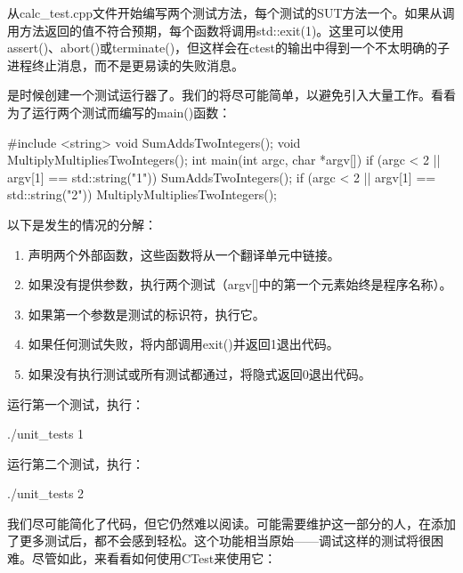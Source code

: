 从calc\_test.cpp文件开始编写两个测试方法，每个测试的SUT方法一个。如果从调用方法返回的值不符合预期，每个函数将调用std::exit(1)。这里可以使用assert()、abort()或terminate()，但这样会在ctest的输出中得到一个不太明确的子进程终止消息，而不是更易读的失败消息。

是时候创建一个测试运行器了。我们的将尽可能简单，以避免引入大量工作。看看为了运行两个测试而编写的main()函数：


\begin{cpp}
#include <string>
void SumAddsTwoIntegers();
void MultiplyMultipliesTwoIntegers();
int main(int argc, char *argv[]) {
    if (argc < 2 || argv[1] == std::string("1"))
        SumAddsTwoIntegers();
    if (argc < 2 || argv[1] == std::string("2"))
        MultiplyMultipliesTwoIntegers();
}
\end{cpp}

以下是发生的情况的分解：

\begin{enumerate}
\item
声明两个外部函数，这些函数将从一个翻译单元中链接。

\item
如果没有提供参数，执行两个测试（argv[]中的第一个元素始终是程序名称）。

\item
如果第一个参数是测试的标识符，执行它。

\item
如果任何测试失败，将内部调用exit()并返回1退出代码。

\item
如果没有执行测试或所有测试都通过，将隐式返回0退出代码。
\end{enumerate}

运行第一个测试，执行：

\begin{shell}
./unit_tests 1
\end{shell}

运行第二个测试，执行：

\begin{shell}
./unit_tests 2
\end{shell}

我们尽可能简化了代码，但它仍然难以阅读。可能需要维护这一部分的人，在添加了更多测试后，都不会感到轻松。这个功能相当原始——调试这样的测试将很困难。尽管如此，来看看如何使用CTest来使用它：


